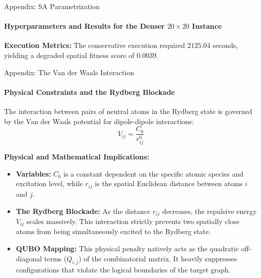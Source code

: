 \documentclass[10pt, aspectratio=169]{beamer}
\begin{document}
\begin{frame}{Appendix: SA Parametrization}
\framesubtitle{Hyperparameters and Results for the Denser $20 \times 20$ Instance}
    \textbf{Execution Metrics:} The conservative execution required $2125.04$ seconds, yielding a degraded spatial fitness score of $0.0039$.
    \vspace{0.2cm}

    \begin{table}[]
        \centering
        \renewcommand{\arraystretch}{1.2}
    \end{table}
\end{frame}

\begin{frame}{Appendix: The Van der Waals Interaction}
\framesubtitle{Physical Constraints and the Rydberg Blockade}
    The interaction between pairs of neutral atoms in the Rydberg state is governed by the Van der Waals potential for dipole-dipole interactions:
    $$ V_{ij} = \frac{C_{6}}{r_{ij}^{6}} $$

    \vspace{0.2cm}
    \textbf{Physical and Mathematical Implications:}
    \begin{itemize}
        \item \textbf{Variables:} $C_6$ is a constant dependent on the specific atomic species and excitation level, while $r_{ij}$ is the spatial Euclidean distance between atoms $i$ and $j$.
        \item \textbf{The Rydberg Blockade:} As the distance $r_{ij}$ decreases, the repulsive energy $V_{ij}$ scales massively. This interaction strictly prevents two spatially close atoms from being simultaneously excited to the Rydberg state.
        \item \textbf{QUBO Mapping:} This physical penalty natively acts as the quadratic off-diagonal terms ($Q_{i,j}$) of the combinatorial matrix. It heavily suppresses configurations that violate the logical boundaries of the target graph.
    \end{itemize}
\end{frame}
\end{document}
